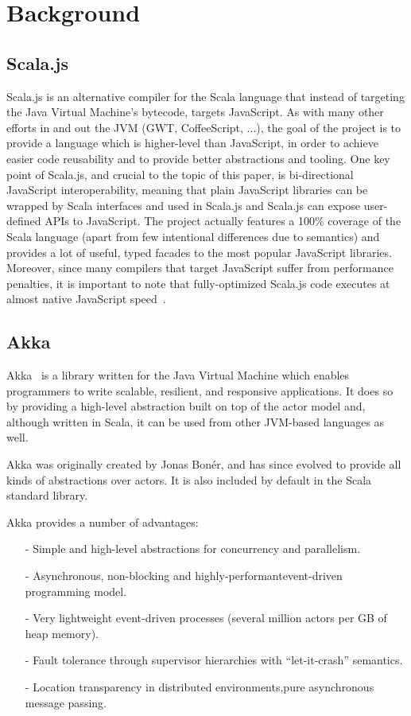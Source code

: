 \documentclass{sig-alternate}
\begin{document}
\section{Background}\label{sec:background}

\subsection{Scala.js}

Scala.js is an alternative compiler for the Scala language that instead of targeting the Java Virtual Machine's bytecode, targets JavaScript.
As with many other efforts in and out the JVM (GWT, CoffeeScript, ...), the goal of the project is to provide a language which is higher-level than JavaScript, in order to achieve easier code reusability and to provide better abstractions and tooling.
One key point of Scala.js, and crucial to the topic of this paper, is bi-directional JavaScript interoperability, meaning that plain JavaScript libraries can be wrapped by Scala interfaces and used in Scala.js and Scala.js can expose user-defined APIs to JavaScript.
The project actually features a 100\% coverage of the Scala language  (apart from few intentional differences due to semantics) and provides a lot of useful, typed facades to the most popular JavaScript libraries. Moreover, since many compilers that target JavaScript suffer from performance penalties, it is important to note that fully-optimized Scala.js code executes at almost native JavaScript speed~\cite{Scalajs}.


\subsection{Akka}\label{sec:akka}

Akka~\cite{Akka} is a library written for the Java Virtual Machine which enables programmers to write scalable, resilient, and responsive applications. It does so by providing a high-level abstraction built on top of the actor model and, although written in Scala, it can be used from other JVM-based languages as well.

Akka was originally created by Jonas Bon\'{e}r, and has since evolved to provide all kinds of abstractions over actors. It is also included by default in the Scala standard library.

Akka provides a number of advantages:
\begin{itemize}
  \item[-] Simple and high-level abstractions for concurrency and parallelism.
  \item[-] Asynchronous, non-blocking and highly-performant\newline event-driven programming model.
  \item[-] Very lightweight event-driven processes (several million actors per GB of heap memory).
  \item[-] Fault tolerance through supervisor hierarchies with ``let-it-crash'' semantics.
  \item[-] Location transparency in distributed environments,\newline pure asynchronous message passing.
\end{itemize}
\end{document}
